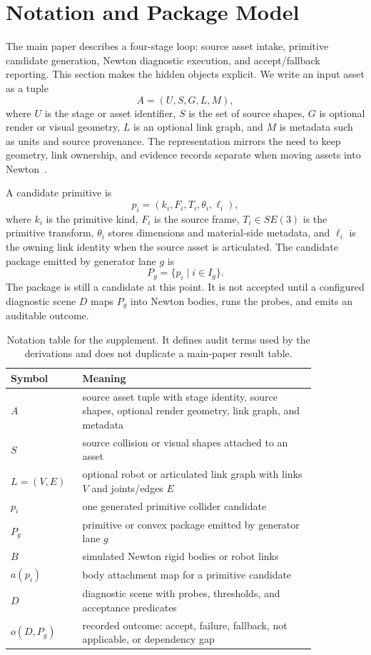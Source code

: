 \section{Notation and Package Model}

The main paper describes a four-stage loop: source asset intake, primitive candidate generation,
Newton diagnostic execution, and accept/fallback reporting. This section makes the hidden objects
explicit. We write an input asset as a tuple
\[
  A = (U, S, G, L, M),
\]
where $U$ is the stage or asset identifier, $S$ is the set of source shapes, $G$ is optional render
or visual geometry, $L$ is an optional link graph, and $M$ is metadata such as units and source
provenance. The representation mirrors the need to keep geometry, link ownership, and evidence
records separate when moving assets into Newton~\cite{openusd2026,newton2026}.

A candidate primitive is
\[
  p_i = (k_i, F_i, T_i, \theta_i, \ell_i),
\]
where $k_i$ is the primitive kind, $F_i$ is the source frame, $T_i \in SE(3)$ is the primitive
transform, $\theta_i$ stores dimensions and material-side metadata, and $\ell_i$ is the owning
link identity when the source asset is articulated. The candidate package emitted by generator lane
$g$ is
\[
  P_g = \{p_i \mid i \in I_g\}.
\]
The package is still a candidate at this point. It is not accepted until a configured diagnostic
scene $D$ maps $P_g$ into Newton bodies, runs the probes, and emits an auditable outcome.

\begin{table}[t]
\centering
\small
\caption{Notation table for the supplement. It defines audit terms used by the derivations and does
not duplicate a main-paper result table.}
\label{tab:supp-notation}
\begin{tabular}{p{0.17\linewidth}p{0.68\linewidth}}
\toprule
Symbol & Meaning \\
\midrule
$A$ & source asset tuple with stage identity, source shapes, optional render geometry, link graph, and metadata \\
$S$ & source collision or visual shapes attached to an asset \\
$L=(V,E)$ & optional robot or articulated link graph with links $V$ and joints/edges $E$ \\
$p_i$ & one generated primitive collider candidate \\
$P_g$ & primitive or convex package emitted by generator lane $g$ \\
$B$ & simulated Newton rigid bodies or robot links \\
$a(p_i)$ & body attachment map for a primitive candidate \\
$D$ & diagnostic scene with probes, thresholds, and acceptance predicates \\
$o(D,P_g)$ & recorded outcome: accept, failure, fallback, not applicable, or dependency gap \\
\bottomrule
\end{tabular}
\end{table}


